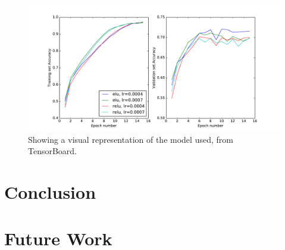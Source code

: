 \documentclass[]{article}
\begin{document}
\begin{figure}[h]
	\includegraphics[width=\textwidth]{ac_res}
	\caption{Showing a visual representation of the model used, from TensorBoard.}
	\label{ac_res}
	\centering
\end{figure}



\section{Conclusion}

\section{Future Work}


\clearpage
\medskip


\end{document}
